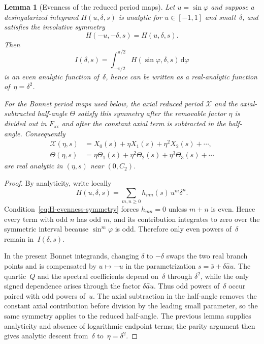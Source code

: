 \documentclass[11pt,a4paper]{article}
\theoremstyle{plain}
\newtheorem{lemma}[theorem]{Lemma}
\theoremstyle{definition}
\theoremstyle{remark}
\newcommand{\dd}{\mathrm{d}}
\begin{document}
\begin{lemma}[Evenness of the reduced period maps]
\label{lem:reduced-period-evenness}
  Let $u=\sin\varphi$ and suppose a desingularized integrand
  $H(u,\delta,s)$ is analytic for $u\in[-1,1]$ and small~$\delta$,
  and satisfies the involutive symmetry
  \begin{equation}\label{eq:H-evenness-symmetry}
    H(-u,-\delta,s)=H(u,\delta,s).
  \end{equation}
  Then
  \[
    I(\delta,s)=\int_{-\pi/2}^{\pi/2}
      H(\sin\varphi,\delta,s)\,\dd\varphi
  \]
  is an even analytic function of~$\delta$, hence can be written as a
  real-analytic function of~$\eta=\delta^2$.

  For the Bonnet period maps used below, the axial reduced period
  $\mathcal X$ and the axial-subtracted half-angle $\Theta$ satisfy
  this symmetry after the removable factor $\eta$ is divided out in
  $F_{\mathrm{ax}}$ and after the constant axial term is subtracted in
  the half-angle.  Consequently
  \begin{align*}
    \mathcal X(\eta,s)
      &=X_0(s)+\eta X_1(s)+\eta^2X_2(s)+\cdots,\\
    \Theta(\eta,s)
      &=\eta\Theta_1(s)+\eta^2\Theta_2(s)+\eta^3\Theta_3(s)+\cdots
  \end{align*}
  are real analytic in $(\eta,s)$ near $(0,C_2)$.
\end{lemma}

\begin{proof}
  By analyticity, write locally
  \[
    H(u,\delta,s)=\sum_{m,n\ge0} h_{mn}(s)\,u^m\delta^n .
  \]
  Condition~\eqref{eq:H-evenness-symmetry} forces $h_{mn}=0$ unless
  $m+n$ is even.  Hence every term with odd $n$ has odd $m$, and its
  contribution integrates to zero over the symmetric interval because
  $\sin^m\varphi$ is odd.  Therefore only even powers of~$\delta$
  remain in~$I(\delta,s)$.

  In the present Bonnet integrands, changing $\delta$ to $-\delta$
  swaps the two real branch points and is compensated by
  $u\mapsto -u$ in the parametrization
  $s=\bar s+\delta\widehat a u$.  The quartic~$Q$ and the spectral
  coefficients depend on~$\delta$ through $\delta^2$, while the only
  signed dependence arises through the factor
  $\delta\widehat a u$.  Thus odd powers of~$\delta$ occur paired with
  odd powers of~$u$.  The axial subtraction in the half-angle removes
  the constant axial contribution before division by the leading
  small parameter, so the same symmetry applies to the reduced
  half-angle.  The previous lemma supplies analyticity and absence of
  logarithmic endpoint terms; the parity argument then gives analytic
  descent from~$\delta$ to~$\eta=\delta^2$.
\end{proof}
\end{document}
